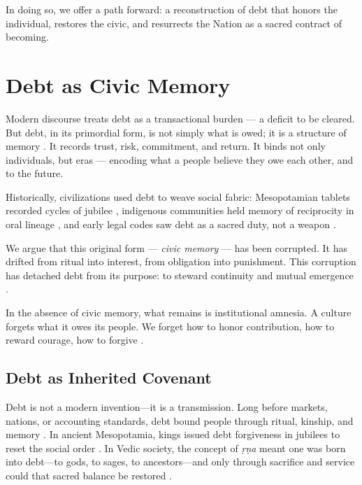 \documentclass[12pt]{article}
\begin{document}
\noindent
In doing so, we offer a path forward: a reconstruction of debt that honors the individual, restores the civic, and resurrects the Nation as a sacred contract of becoming.

\section{Debt as Civic Memory}

Modern discourse treats debt as a transactional burden — a deficit to be cleared. But debt, in its primordial form, is not simply what is owed; it is a structure of memory \parencite{graeber2011debt}. It records trust, risk, commitment, and return. It binds not only individuals, but eras — encoding what a people believe they owe each other, and to the future.

Historically, civilizations used debt to weave social fabric: Mesopotamian tablets recorded cycles of jubilee \parencite{hudson2018and}, indigenous communities held memory of reciprocity in oral lineage \parencite{kimmerer2013braiding}, and early legal codes saw debt as a sacred duty, not a weapon \parencite{graeber2011debt}.

We argue that this original form — \textit{civic memory} — has been corrupted. It has drifted from ritual into interest, from obligation into punishment. This corruption has detached debt from its purpose: to steward continuity and mutual emergence \parencite{polanyi2001great}.

In the absence of civic memory, what remains is institutional amnesia. A culture forgets what it owes its people. We forget how to honor contribution, how to reward courage, how to forgive \parencite{lubell2015governing}.

\vspace{1cm}
\subsection{Debt as Inherited Covenant}
Debt is not a modern invention—it is a transmission. Long before markets, nations, or accounting standards, debt bound people through ritual, kinship, and memory \parencite{graeber2011debt}. In ancient Mesopotamia, kings issued debt forgiveness in jubilees to reset the social order \parencite{hudson2018and}. In Vedic society, the concept of \textit{ṛṇa} meant one was born into debt—to gods, to sages, to ancestors—and only through sacrifice and service could that sacred balance be restored \parencite{mishra2006human}.
\end{document}
